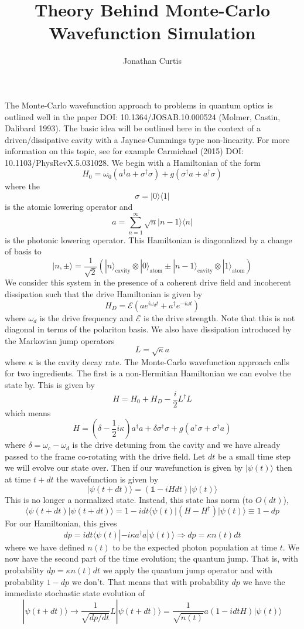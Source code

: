 \documentclass[11pt, oneside]{article}
\title{Theory Behind Monte-Carlo Wavefunction Simulation}
\author{Jonathan Curtis}
\begin{document}
\maketitle

The Monte-Carlo wavefunction approach to problems in quantum optics is outlined well in the paper DOI: 10.1364/JOSAB.10.000524 (Molmer, Castin, Dalibard 1993). The basic idea will be outlined here in the context of a driven/dissipative cavity with a Jaynes-Cummings type non-linearity. For more information on this topic, see for example Carmichael (2015) DOI: 10.1103/PhysRevX.5.031028.  We begin with a Hamiltonian of the form 
\[
H_0 = \omega_0(a^\dagger a + \sigma^\dagger \sigma) + g(\sigma^\dagger a + a^\dagger \sigma)
\]
where the 
\[
\sigma = |0\rangle \langle 1| 
\]
is the atomic lowering operator and 
\[
a = \sum_{n=1}^{\infty} \sqrt{n}|n-1\rangle \langle n|
\]
is the photonic lowering operator. This Hamiltonian is diagonalized by a change of basis to 
\[
|n,\pm\rangle = \frac{1}{\sqrt{2}}\left(|n\rangle_{\textrm{cavity}}\otimes |0\rangle_{\textrm{atom}} \pm |n-1\rangle_{\textrm{cavity}}\otimes|1\rangle_{\textrm{atom}}\right)
\]
We consider this system in the presence of a coherent drive field and incoherent dissipation such that the drive Hamiltonian is given by 
\[
H_{D} = \mathcal{E} \left(a e^{i\omega_d t} + a^\dagger e^{-i\omega t}\right)
\]
where $\omega_d$ is the drive frequency and $\mathcal{E}$ is the drive strength. Note that this is not diagonal in terms of the polariton basis. We also have dissipation introduced by the Markovian jump operators 
\[
L = \sqrt{\kappa} a
\]
where $\kappa$ is the cavity decay rate. The Monte-Carlo wavefunction approach calls for two ingredients. The first is a non-Hermitian Hamiltonian we can evolve the state by. This is given by 
\[
H = H_0 +H_D -\frac{i}{2} L^\dagger L
\]
which means 
\[
H = (\delta - \frac12i\kappa)a^\dagger a + \delta \sigma^\dagger \sigma + g(a^\dagger \sigma + \sigma^\dagger a)
\]
where $\delta =\omega_c - \omega_d$ is the drive detuning from the cavity and we have already passed to the frame co-rotating with the drive field. Let $dt$ be a small time step we will evolve our state over. Then if our wavefunction is given by $|\psi(t)\rangle$ then at time $t+dt$ the wavefunction is given by 
\[
|\psi(t+dt)\rangle = \left(\mathds{1} - iHdt\right)|\psi(t)\rangle
\]
This is no longer a normalized state. Instead, this state has norm (to $O(dt)$), 
\[
\langle \psi(t+dt)| \psi(t+dt)\rangle = 1 -idt \langle \psi(t) | (H-H^\dagger)|\psi(t)\rangle \equiv 1 - dp 
\]
For our Hamiltonian, this gives 
\[
dp = i dt \langle \psi(t) | -i\kappa a^\dagger a |\psi(t)\rangle \Rightarrow dp = \kappa n(t) dt 
\]
where we have defined $n(t)$ to be the expected photon population at time $t$. We now have the second part of the time evolution; the quantum jump. That is, with probability $dp = \kappa n(t) dt$ we apply the quantum jump operator and with probability $1-dp$ we don't. That means that with probability $dp$ we have the immediate stochastic state evolution of 
\[
|\psi(t+dt)\rangle \rightarrow \frac{1}{\sqrt{dp/dt}} L |\psi(t+dt)\rangle = \frac{1}{\sqrt{n(t)}}a \left(1-idt H\right) |\psi(t)\rangle
\]
\end{document}
